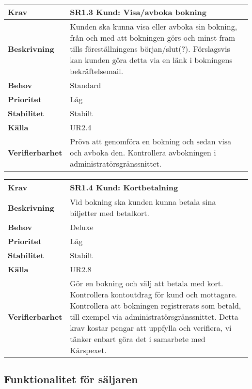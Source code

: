 \documentclass[a4paper, twoside, 11pt, titlepage]{article}
\begin{document}
	\begin{tabular} { p{2.6cm} p{12.5cm} }
		\hline
		\sffamily\textbf{Krav} & \sffamily\textbf{SR1.3 Kund: Visa/avboka bokning } \\
		\hline
		\sffamily\textbf{Beskrivning} & Kunden ska kunna visa eller avboka sin bokning, från och med att bokningen görs och minst fram tills föreställningens början/slut(?). Förslagsvis kan kunden göra detta via en länk i bokningens bekräftelsemail.  \\
		\hline
		\sffamily\textbf{Behov} & Standard  \\
		\hline
		\sffamily\textbf{Prioritet} & Låg  \\
		\hline
		\sffamily\textbf{Stabilitet} & Stabilt  \\
		\hline
		\sffamily\textbf{Källa} & UR2.4  \\
		\hline
		\sffamily\textbf{Verifierbarhet} & Pröva att genomföra en bokning och sedan visa och avboka den. Kontrollera avbokningen i administratörsgränssnittet.  \\
		\hline
	\end{tabular}
	\vspace{6mm}

	\begin{tabular} { p{2.6cm} p{12.5cm} }
		\hline
		\sffamily\textbf{Krav} & \sffamily\textbf{SR1.4 Kund: Kortbetalning } \\
		\hline
		\sffamily\textbf{Beskrivning} & Vid bokning ska kunden kunna betala sina biljetter med betalkort.  \\
		\hline
		\sffamily\textbf{Behov} & Deluxe  \\
		\hline
		\sffamily\textbf{Prioritet} & Låg  \\
		\hline
		\sffamily\textbf{Stabilitet} & Stabilt  \\
		\hline
		\sffamily\textbf{Källa} & UR2.8  \\
		\hline
		\sffamily\textbf{Verifierbarhet} & Gör en bokning och välj att betala med kort. Kontrollera kontoutdrag för kund och mottagare. Kontrollera att bokningen registrerats som betald, till exempel via administratörsgränssnittet. Detta krav kostar pengar att uppfylla och verifiera, vi tänker enbart göra det i samarbete med Kårspexet.  \\
		\hline
	\end{tabular}


	\subsection{Funktionalitet för säljaren}
\end{document}
